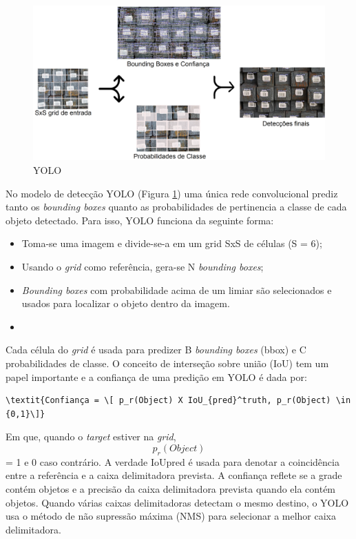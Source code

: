 \begin{figure}[htbp]
		\centering
		\includegraphics[scale=0.2]{figuras/MachineLearning/yolo.png}
		\caption{YOLO}
		\label{fig:yolo}
\end{figure}

No modelo de detecção YOLO (Figura \ref{fig:yolo}) uma única rede convolucional prediz tanto os \textit{bounding boxes} quanto as probabilidades de pertinencia a classe de cada objeto detectado. Para isso, YOLO funciona da seguinte forma:

\begin{itemize}
    \item Toma-se uma imagem e divide-se-a em um grid SxS de células (S = 6);
    \item Usando o \textit{grid} como referência, gera-se N \textit{bounding boxes};
    \item \textit{Bounding boxes} com probabilidade acima de um limiar são selecionados e usados para localizar o objeto dentro da imagem.
    \item
\end{itemize}

Cada célula do  \textit{grid} é usada para predizer B  \textit{bounding boxes} (bbox) e C probabilidades de classe. O conceito de interseção sobre união (IoU) tem um papel importante e a confiança de uma predição em YOLO é dada por:

\begin{lstlisting}[caption=Posições de X e Y nas \textit{Bounding Boxes}, label=cod:confianca]
        \textit{Confiança = \[ p_r(Object) X IoU_{pred}^truth, p_r(Object) \in {0,1}\]}
\end{lstlisting}

Em que, quando o \textit{target} estiver na \textit{grid}, \[p_r(Object)\] = 1 e 0 caso contrário. A verdade IoUpred é usada para denotar a coincidência entre a referência e a caixa delimitadora prevista. A confiança reflete se a grade contém objetos e a precisão da caixa delimitadora prevista quando ela contém objetos. Quando várias caixas delimitadoras detectam o mesmo destino, o YOLO usa o método de não supressão máxima (NMS) para selecionar a melhor caixa delimitadora.


